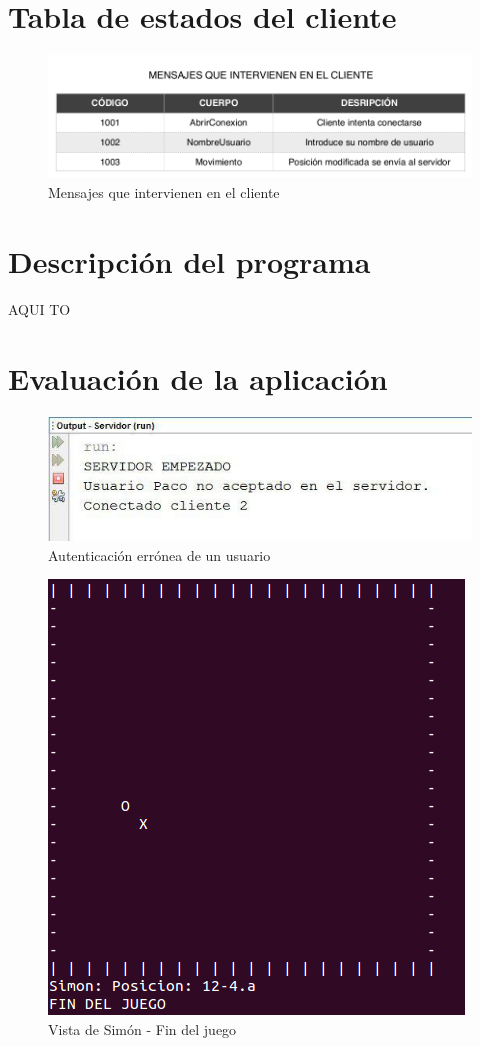 \section{Tabla de estados del cliente}	

\begin{figure}[h]
	\centering
	\includegraphics[width=.8\textwidth]{img/2}
	\caption{Mensajes que intervienen en el cliente}
\end{figure}




\section{Descripción del programa}	

AQUI TO



\newpage

\section{Evaluación de la aplicación}


\begin{figure}[h]
	\centering
	\includegraphics[width=.5\textwidth]{img/6}
	\caption{Autenticación errónea de un usuario}
\end{figure}


\begin{figure}[h]
	\centering
	\includegraphics[width=.4\textwidth]{img/4}
	\caption{Vista de Simón - Fin del juego}
\end{figure}

